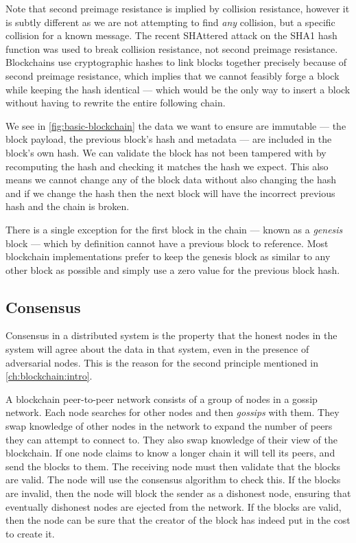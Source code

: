 Note that second preimage resistance is implied by collision resistance, however it is subtly different as we are not attempting to find \emph{any} collision, but a specific collision for a known message. The recent SHAttered \cite{stevensFirstCollisionFull2017} attack on the SHA1 hash function was used to break collision resistance, not second preimage resistance. Blockchains use cryptographic hashes to link blocks together precisely because of second preimage resistance, which implies that we cannot feasibly forge a block while keeping the hash identical --- which would be the only way to insert a block without having to rewrite the entire following chain.

We see in \autoref{fig:basic-blockchain} the data we want to ensure are immutable --- the block payload, the previous block's hash and metadata --- are included in the block's own hash.  We can validate the block has not been tampered with by recomputing the hash and checking it matches the hash we expect. This also means we cannot change any of the block data without also changing the hash and if we change the hash then the next block will have the incorrect previous hash and the chain is broken.

There is a single exception for the first block in the chain --- known as a \emph{genesis} block --- which by definition cannot have a previous block to reference. Most blockchain implementations prefer to keep the genesis block as similar to any other block as possible and simply use a zero value for the previous block hash.


\subsection{Consensus}
\label{ch:blockchain:structure:consensus}

Consensus in a distributed system is the property that the honest nodes in the system will agree about the data in that system, even in the presence of adversarial nodes. This is the reason for the second principle mentioned in \autoref{ch:blockchain:intro}.

A blockchain peer-to-peer network consists of a group of nodes in a gossip network. Each node searches for other nodes and then \emph{gossips} with them. They swap knowledge of other nodes in the network to expand the number of peers they can attempt to connect to. They also swap knowledge of their view of the blockchain. If one node claims to know a longer chain it will tell its peers, and send the blocks to them. The receiving node must then validate that the blocks are valid. The node will use the consensus algorithm to check this. If the blocks are invalid, then the node will block the sender as a dishonest node, ensuring that eventually dishonest nodes are ejected from the network. If the blocks are valid, then the node can be sure that the creator of the block has indeed put in the cost to create it.

